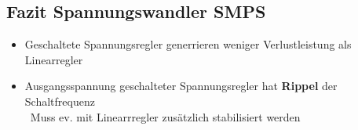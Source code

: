 \subsection{Fazit Spannungswandler SMPS}

\begin{itemize}
    \item Geschaltete Spannungsregler generrieren weniger Verlustleistung als Linearregler
    \item Ausgangsspannung geschalteter Spannungsregler hat \textbf{Rippel} der Schaltfrequenz \\
        \textrightarrow\ Muss ev. mit Linearrregler zusätzlich stabilisiert werden
\end{itemize}